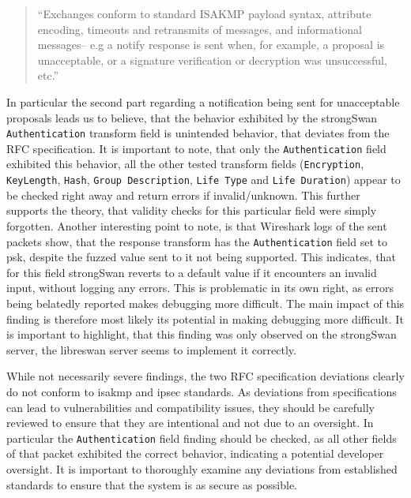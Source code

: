 \begin{quotation}
	``Exchanges conform to standard ISAKMP payload syntax, attribute
	encoding, timeouts and retransmits of messages, and informational
	messages-- e.g a notify response is sent when, for example, a
	proposal is unacceptable, or a signature verification or decryption
	was unsuccessful, etc.''
\end{quotation}

In particular the second part regarding a notification being sent for unacceptable proposals leads us to believe, that the behavior exhibited by the strongSwan \texttt{Authentication} transform field is unintended behavior, that deviates from the RFC specification. It is important to note, that only the \texttt{Authentication} field exhibited this behavior, all the other tested transform fields (\texttt{Encryption}, \texttt{KeyLength}, \texttt{Hash}, \texttt{Group Description}, \texttt{Life Type} and \texttt{Life Duration}) appear to be checked right away and return errors if invalid/unknown. This further supports the theory, that validity checks for this particular field were simply forgotten. Another interesting point to note, is that Wireshark logs of the sent packets show, that the response transform has the \texttt{Authentication} field set to \ac{psk}, despite the fuzzed value sent to it not being supported. This indicates, that for this field strongSwan reverts to a default value if it encounters an invalid input, without logging any errors. This is problematic in its own right, as errors being belatedly reported makes debugging more difficult. The main impact of this finding is therefore most likely its potential in making debugging more difficult. It is important to highlight, that this finding was only observed on the strongSwan server, the libreswan server seems to implement it correctly.

While not necessarily severe findings, the two RFC specification deviations clearly do not conform to \ac{isakmp} and \ac{ipsec} standards. As deviations from specifications can lead to vulnerabilities and compatibility issues, they should be carefully reviewed to ensure that they are intentional and not due to an oversight. In particular the \texttt{Authentication} field finding should be checked, as all other fields of that packet exhibited the correct behavior, indicating a potential developer oversight. It is important to thoroughly examine any deviations from established standards to ensure that the system is as secure as possible.

